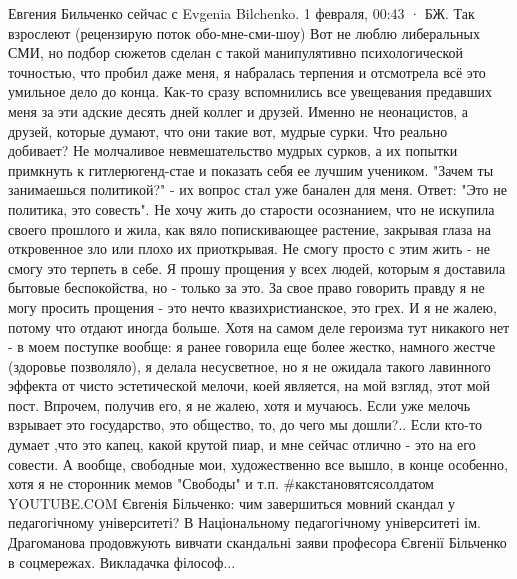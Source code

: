 \documentclass[a4paper,11pt]{extreport}
\begin{document}
Евгения Бильченко сейчас с Evgenia Bilchenko.
1 февраля, 00:43 ·
БЖ. Так взрослеют (рецензирую поток обо-мне-сми-шоу)
Вот не люблю либеральных СМИ, но подбор сюжетов сделан с такой манипулятивно психологической точностью, что пробил даже меня, я набралась терпения и отсмотрела всё это умильное дело до конца.
Как-то сразу вспомнились все увещевания предавших меня за эти адские десять дней коллег и друзей. Именно не неонацистов, а друзей, которые думают, что они такие вот, мудрые сурки. Что реально добивает? Не молчаливое невмешательство мудрых сурков, а их попытки примкнуть к гитлерюгенд-стае и показать себя ее лучшим учеником. "Зачем ты занимаешься политикой?" - их вопрос стал уже банален для меня. Ответ: "Это не политика, это совесть".
Не хочу жить до старости осознанием, что не искупила своего прошлого и жила, как вяло попискивающее растение, закрывая глаза на откровенное зло или плохо их приоткрывая. Не смогу просто с этим жить - не смогу это терпеть в себе. Я прошу прощения у всех людей, которым я доставила бытовые беспокойства, но - только за это. За свое право говорить правду я не могу просить прощения - это нечто квазихристианское, это грех. И я не жалею, потому что отдают иногда больше.
Хотя на самом деле героизма тут никакого нет - в моем поступке вообще: я ранее говорила еще более жестко, намного жестче (здоровье позволяло), я делала несусветное, но я не ожидала такого лавинного эффекта от чисто эстетической мелочи, коей является, на мой взгляд, этот мой пост. Впрочем, получив его, я не жалею, хотя и мучаюсь. Если уже мелочь взрывает это государство, это общество, то, до чего мы дошли?..
Если кто-то думает ,что это капец, какой крутой пиар, и мне сейчас отлично - это на его совести.
А вообще, свободные мои, художественно все вышло, в конце особенно, хотя я не сторонник мемов "Свободы" и т.п.
#какстановятсясолдатом
YOUTUBE.COM
Євгенія Більченко: чим завершиться мовний скандал у педагогічному університеті?
В Національному педагогічному університеті ім. Драгоманова продовжують вивчати скандальні заяви професора Євгенії Більченко в соцмережах. Викладачка філософ...
\end{document}
